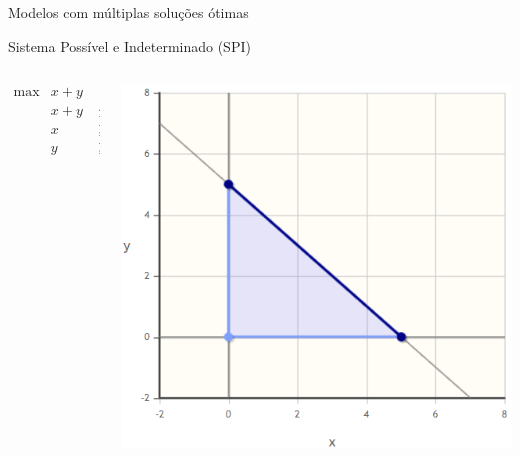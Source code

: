 \documentclass[compress,mathserif]{beamer}
\begin{document}
\begin{frame}{Modelos com múltiplas soluções ótimas}

Sistema Possível e Indeterminado (SPI)

\vspace{1cm}

\begin{columns}[T]
    \begin{column}{.49\textwidth}
    \vspace{1cm}
    $$\begin{matrix}
        \max & x + y \\ 
             & x + y & \leq 5 \\
             & x & \geq 0 \\
             & y & \geq 0 
        \end{matrix}    
$$
    \end{column}
    \begin{column}{.49\textwidth}
        \centering\includegraphics[width=\linewidth]{images/multiplas_solucoes.png}
    \end{column}
\end{columns}

\end{frame}
\end{document}
